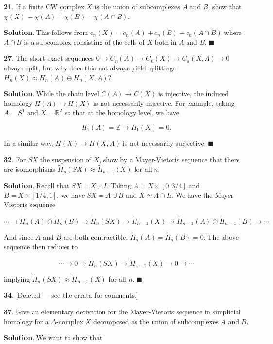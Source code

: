 \documentclass{article}
\newcommand{\R}{\mathbb{R}}
\newcommand{\Z}{\mathbb{Z}}
\begin{document}
\textbf{21}. If a finite CW complex $X$ is the union of subcomplexes $A$ and $B$, show that $\chi(X) = \chi(A) + \chi(B) - \chi(A\cap B)$.
\medskip

\textbf{Solution}. This follows from $c_{n}(X) = c_{n}(A) + c_{n}(B) - c_{n}(A\cap B)$ where $A\cap B$ is a subcomplex consisting of the cells of $X$ both in $A$ and $B$. $\blacksquare$
\bigskip
\bigskip

\textbf{27}. The short exact sequences $0\to C_{n}(A)\to C_{n}(X)\to C_{n}(X, A)\to 0$ always split, but why does this not always yield splittings $H_{n}(X)\approx H_{n}(A)\oplus H_{n}(X, A)$?
\medskip

\textbf{Solution}. While the chain level $C(A)\to C(X)$ is injective, the induced homology $H(A)\to H(X)$ is not necessarily injective. For example, taking $A = S^{1}$ and $X = \R^{2}$ so that at the homology level, we have

$$H_{1}(A) = \Z \to H_{1}(X) = 0.$$

In a similar way, $H(X)\to H(X, A)$ is not necessarily surjective.  $\blacksquare$
\bigskip
\bigskip

\textbf{32}. For $SX$ the suspension of $X$, show by a Mayer-Vietoris sequence that there are isomorphisms $\tilde{H}_{n}(SX)\approx \tilde{H}_{n-1}(X)$ for all $n$.
\medskip

\textbf{Solution}. Recall that $SX = X\times I$. Taking $A = X\times [0, 3/4]$ and $B = X\times [1/4, 1]$, we have $SX = A\cup B$ and $X\simeq A\cap B$. We have the Mayer-Vietoris sequence

$$\cdots \to \tilde{H}_{n}(A)\oplus \tilde{H}_{n}(B)\to \tilde{H}_{n}(SX)\to \tilde{H}_{n-1}(X)\to \tilde{H}_{n-1}(A)\oplus \tilde{H}_{n-1}(B)\to \cdots$$

And since $A$ and $B$ are both contractible, $\tilde{H}_{n}(A) = \tilde{H}_{n}(B) = 0$. The above sequence then reduces to

$$\cdots \to 0\to \tilde{H}_{n}(SX)\to \tilde{H}_{n-1}(X)\to 0\to \cdots$$

implying $\tilde{H}_{n}(SX)\approx \tilde{H}_{n-1}(X)$ for all $n$. $\blacksquare$
\bigskip
\bigskip

\textbf{34}. [Deleted — see the errata for comments.]
\bigskip
\bigskip

\textbf{37}. Give an elementary derivation for the Mayer-Vietoris sequence in simplicial homology for a $\Delta$-complex $X$ decomposed as the union of subcomplexes $A$ and $B$.
\medskip

\textbf{Solution}. We want to show that
\end{document}

